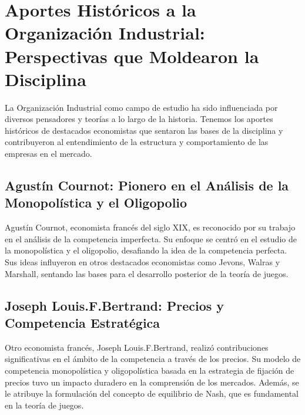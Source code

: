 \documentclass[
  a4paper,
]{article}
\begin{document}
\hypertarget{aportes-histuxf3ricos-a-la-organizaciuxf3n-industrial-perspectivas-que-moldearon-la-disciplina}{%
\section{Aportes Históricos a la Organización Industrial: Perspectivas
que Moldearon la
Disciplina}\label{aportes-histuxf3ricos-a-la-organizaciuxf3n-industrial-perspectivas-que-moldearon-la-disciplina}}

La Organización Industrial como campo de estudio ha sido influenciada
por diversos pensadores y teorías a lo largo de la historia. Tenemos los
aportes históricos de destacados economistas que sentaron las bases de
la disciplina y contribuyeron al entendimiento de la estructura y
comportamiento de las empresas en el mercado.

\hypertarget{agustuxedn-cournot-pionero-en-el-anuxe1lisis-de-la-monopoluxedstica-y-el-oligopolio}{%
\subsection{Agustín Cournot: Pionero en el Análisis de la Monopolística
y el
Oligopolio}\label{agustuxedn-cournot-pionero-en-el-anuxe1lisis-de-la-monopoluxedstica-y-el-oligopolio}}

Agustín Cournot, economista francés del siglo XIX, es reconocido por su
trabajo en el análisis de la competencia imperfecta. Su enfoque se
centró en el estudio de la monopolística y el oligopolio, desafiando la
idea de la competencia perfecta. Sus ideas influyeron en otros
destacados economistas como Jevons, Walras y Marshall, sentando las
bases para el desarrollo posterior de la teoría de juegos.

\hypertarget{joseph-louis.f.bertrand-precios-y-competencia-estratuxe9gica}{%
\subsection{Joseph Louis.F.Bertrand: Precios y Competencia
Estratégica}\label{joseph-louis.f.bertrand-precios-y-competencia-estratuxe9gica}}

Otro economista francés, Joseph Louis.F.Bertrand, realizó contribuciones
significativas en el ámbito de la competencia a través de los precios.
Su modelo de competencia monopolística y oligopolística basada en la
estrategia de fijación de precios tuvo un impacto duradero en la
comprensión de los mercados. Además, se le atribuye la formulación del
concepto de equilibrio de Nash, que es fundamental en la teoría de
juegos.
\end{document}
